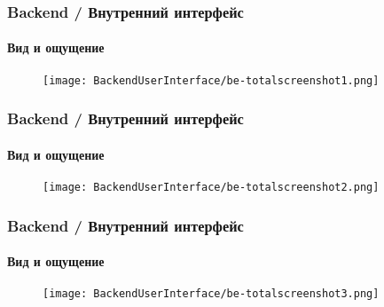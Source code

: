 
\begin{frame}[fragile]
	\frametitle{Backend / Внутренний интерфейс}
	\framesubtitle{Вид и ощущение}

	\begin{figure}
		\texttt{[image: BackendUserInterface/be-totalscreenshot1.png]}
	\end{figure}

\end{frame}


\begin{frame}[fragile]
	\frametitle{Backend / Внутренний интерфейс}
	\framesubtitle{Вид и ощущение}

	\begin{figure}
		\texttt{[image: BackendUserInterface/be-totalscreenshot2.png]}
	\end{figure}

\end{frame}


\begin{frame}[fragile]
	\frametitle{Backend / Внутренний интерфейс}
	\framesubtitle{Вид и ощущение}

	\begin{figure}
		\texttt{[image: BackendUserInterface/be-totalscreenshot3.png]}
	\end{figure}

\end{frame}


